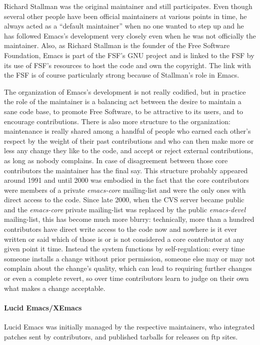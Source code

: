 \documentclass[format=acmsmall,screen]{acmart}
\begin{document}
Richard Stallman was the original maintainer and still participates.  Even
though several other people have been official maintainers at various points
in time, he always acted as a ``default maintainer'' when no one wanted to
step up and he has followed Emacs's development very closely even when he
was not officially the maintainer.  Also, as Richard Stallman is
the founder of the Free Software Foundation, Emacs is part of the FSF's GNU
project and is linked to the FSF by its use of FSF's resources to host
the code and own the copyright.  The link with the FSF is of course
particularly strong because of Stallman's role in Emacs.

The organization of Emacs's development is not really codified, but in
practice the role of the maintainer is a balancing act between the desire to
maintain a sane code base, to promote Free Software, to be attractive to its
users, and to encourage contributions.  There is also more structure to the
organization: maintenance is really shared among a handful of people who
earned each other's respect by the weight of their past contributions and
who can then make more or less any change they like to the code, and accept
or reject external contributions, as long as nobody complains.  In case of
disagreement between those core contributors the maintainer has the final
say.  This structure probably appeared around 1991 and until 2000 was
embodied in the fact that the core contributors were members of a private
\emph{emacs-core} mailing-list and were the only ones with direct access to
the code.  Since late 2000, when the CVS server became public and the
\emph{emacs-core} private mailing-list was replaced by the public
\emph{emacs-devel} mailing-list, this has become much more blurry:
technically, more than a hundred contributors have direct write access to
the code now and nowhere is it ever written or said which of those is or
is not considered a core contributor at any given point it time.  Instead the
system functions by self-regulation: every time someone installs a change
without prior permission, someone else may or may not complain about the
change's quality, which can lead to requiring further changes or even
a complete revert, so over time contributors learn to judge on their own
what makes a change acceptable.

\paragraph{Lucid Emacs/XEmacs}
Lucid Emacs was initially managed by the respective maintainers, who
integrated patches sent by contributors, and published tarballs for
releases on ftp sites.
\end{document}
